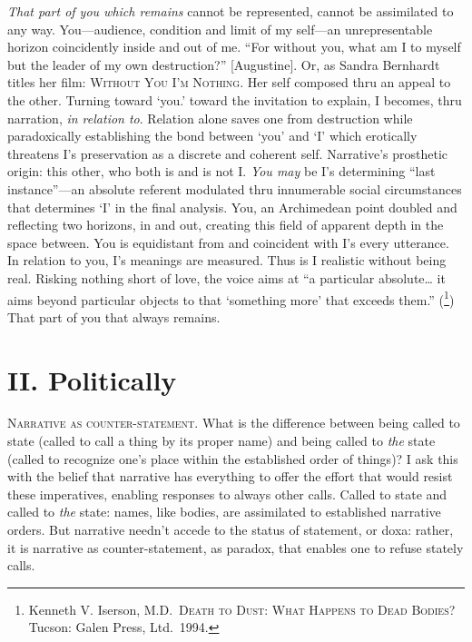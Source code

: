 \documentclass[
]{memoir}
\begin{document}
\emph{That part of you which remains} cannot be represented, cannot be
assimilated to any way. You---audience, condition and limit of my
self---an unrepresentable horizon coincidently inside and out of me.
``For without you, what am I to myself but the leader of my own
destruction?'' {[}Augustine{]}. Or, as Sandra Bernhardt titles her film:
\textsc{Without You I'm Nothing}. Her self composed thru an appeal to
the other. Turning toward `you.' toward the invitation to explain, I
becomes, thru narration, \emph{in relation to}. Relation alone saves one
from destruction while paradoxically establishing the bond between `you'
and `I' which erotically threatens I's preservation as a discrete and
coherent self. Narrative's prosthetic origin: this other, who both is
and is not I. \emph{You may} be I's determining ``last instance''---an
absolute referent modulated thru innumerable social circumstances that
determines `I' in the final analysis. You, an Archimedean point doubled
and reflecting two horizons, in and out, creating this field of apparent
depth in the space between. You is equidistant from and coincident with
I's every utterance. In relation to you, I's meanings are measured. Thus
is I realistic without being real. Risking nothing short of love, the
voice aims at ``a particular absolute\ldots{} it aims beyond particular
objects to that `something more' that exceeds them.'' (\footnote{Kenneth
  V. Iserson, M.D.~\textsc{Death to Dust: What Happens to Dead Bodies?}
  Tucson: Galen Press, Ltd.~1994.}) That part of you that always
remains.

\hypertarget{ii.-politically}{%
\section*{II. Politically}\label{ii.-politically}}

\textsc{Narrative as counter-statement}. What is the difference between
being called to state (called to call a thing by its proper name) and
being called to \emph{the} state (called to recognize one's place within
the established order of things)? I ask this with the belief that
narrative has everything to offer the effort that would resist these
imperatives, enabling responses to always other calls. Called to state
and called to \emph{the} state: names, like bodies, are assimilated to
established narrative orders. But narrative needn't accede to the status
of statement, or doxa: rather, it is narrative as counter-statement, as
paradox, that enables one to refuse stately calls.
\end{document}
